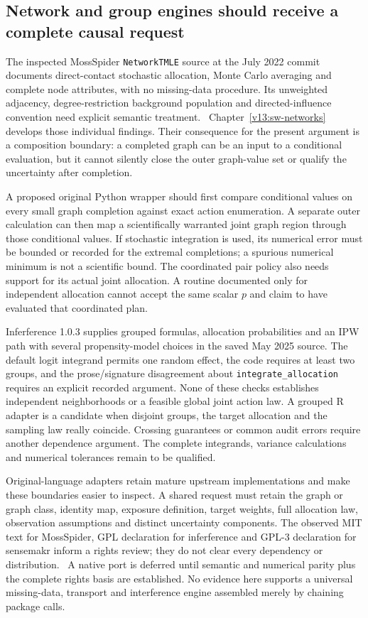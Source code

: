 \subsection{Network and group engines should receive a complete causal request}

The inspected MossSpider \texttt{NetworkTMLE} source at the July 2022 commit
documents direct-contact stochastic allocation, Monte Carlo averaging and
complete node attributes, with no missing-data procedure. Its unweighted
adjacency, degree-restriction background population and directed-influence
convention need explicit semantic treatment.~\citep{v13_sw_mossspider}
Chapter~\ref{v13:sw-networks} develops those individual findings. Their
consequence for the present argument is a composition boundary: a completed graph can be an
input to a conditional evaluation, but it cannot silently close the outer
graph-value set or qualify the uncertainty after completion.

A proposed original Python wrapper should first compare conditional values
on every small graph completion against exact action enumeration. A separate
outer calculation can then map a scientifically warranted joint graph region
through those conditional values. If stochastic integration is used, its
numerical error must be bounded or recorded for the extremal completions;
a spurious numerical minimum is not a scientific bound. The coordinated
pair policy also needs support for its actual joint allocation. A routine
documented only for independent allocation cannot accept the same scalar
$p$ and claim to have evaluated that coordinated plan.

Inferference 1.0.3 supplies grouped formulas, allocation probabilities and an
IPW path with several propensity-model choices in the saved May 2025 source.
The default logit integrand permits one random effect, the code requires at
least two groups, and the prose/signature disagreement about
\texttt{integrate\_allocation} requires an explicit recorded argument.
\citep{v13_sw_inferference} None of these checks establishes independent
neighborhoods or a feasible global joint action law. A grouped R adapter is
a candidate when disjoint groups, the target allocation and the sampling law
really coincide. Crossing guarantees or common audit errors require another
dependence argument. The complete integrands, variance calculations and
numerical tolerances remain to be qualified.

Original-language adapters retain mature upstream implementations and make
these boundaries easier to inspect. A shared request must retain the graph
or graph class, identity map, exposure definition, target weights, full
allocation law, observation assumptions and distinct uncertainty components.
The observed MIT text for MossSpider, GPL declaration for inferference and
GPL-3 declaration for sensemakr inform a rights review; they do not clear
every dependency or distribution.~\citep{exec17_s7_paths} A native port is
deferred until semantic and numerical parity plus the complete rights basis
are established. No evidence here supports a universal missing-data,
transport and interference engine assembled merely by chaining package calls.


